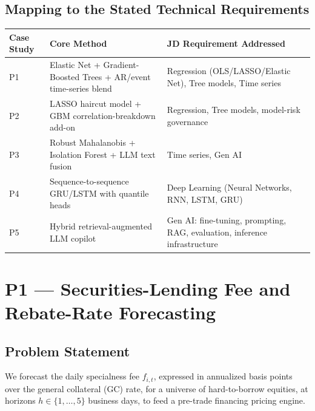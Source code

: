 \documentclass[11pt]{report}
\begin{document}
\section{Mapping to the Stated Technical Requirements}
\begin{center}
\begin{tabular}{p{2.7cm}p{6.3cm}p{5.5cm}}
\toprule
\textbf{Case Study} & \textbf{Core Method} & \textbf{JD Requirement Addressed} \\
\midrule
P1 & Elastic Net + Gradient-Boosted Trees + AR/event time-series blend & Regression (OLS/LASSO/Elastic Net), Tree models, Time series \\
P2 & LASSO haircut model + GBM correlation-breakdown add-on & Regression, Tree models, model-risk governance \\
P3 & Robust Mahalanobis + Isolation Forest + LLM text fusion & Time series, Gen AI \\
P4 & Sequence-to-sequence GRU/LSTM with quantile heads & Deep Learning (Neural Networks, RNN, LSTM, GRU) \\
P5 & Hybrid retrieval-augmented LLM copilot & Gen AI: fine-tuning, prompting, RAG, evaluation, inference infrastructure \\
\bottomrule
\end{tabular}
\end{center}

\chapter{P1 --- Securities-Lending Fee and Rebate-Rate Forecasting}

\section{Problem Statement}
We forecast the daily specialness fee $f_{i,t}$, expressed in annualized basis points over the general
collateral (GC) rate, for a universe of hard-to-borrow equities, at horizons $h \in \{1,\dots,5\}$
business days, to feed a pre-trade financing pricing engine.
\end{document}
